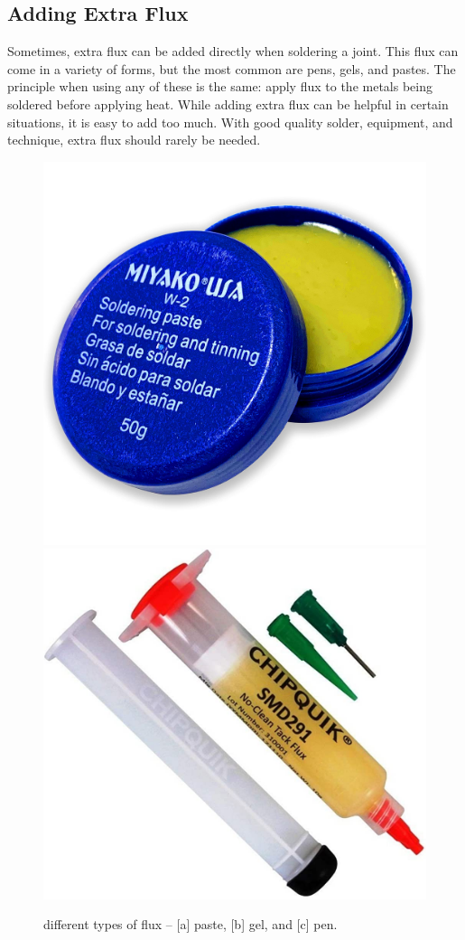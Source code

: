 \subsection{Adding Extra Flux}
Sometimes, extra flux can be added directly when soldering a joint. This flux can come in a variety of forms, but the most common are pens, gels, and pastes. The principle when using any of these is the same: apply flux to the metals being soldered before applying heat. While adding extra flux can be helpful in certain situations, it is easy to add too much. With good quality solder, equipment, and technique, extra flux should rarely be needed.
\begin{figure}[h]
    \caption{different types of flux – [a] paste, [b] gel, and [c] pen.}
    \centering
    \includegraphics[scale=0.04]{images/flux_paste.jpg}
    \includegraphics[scale=0.1]{images/flux_gel.jpg}

\end{figure}
